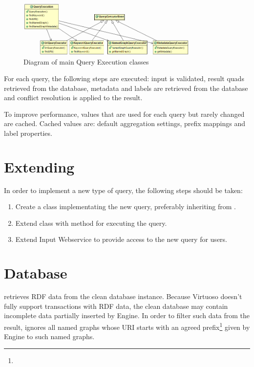 \begin{figure}[htb]
    \centering
    \includegraphics[width=0.8\textwidth]{images/dia-qe.png}
    \caption{Diagram of main Query Execution classes}
	\label{fig:qeClasses}
\end{figure}

For each query, the following steps are executed: input is validated, result quads retrieved from the database, metadata and labels are retrieved from the database and conflict resolution is applied to the result.

To improve performance, values that are used for each query but rarely changed are cached. Cached values are: default aggregation settings, prefix mappings and label properties.

\section{Extending}
\label{sec:qeExtending}
In order to implement a new type of query, the following steps should be taken:

\begin{enumerate}
	\item Create a class implementating the new query, preferably inheriting from .
	\item Extend  class with method for executing the query.
	\item Extend Input Webservice to provide access to the new query for users.
\end{enumerate}

\section{Database}
\QE retrieves RDF data from the clean database instance. Because Virtuoso doesn't fully support transactions with RDF data, the clean database may contain incomplete data partially inserted by Engine. In order to filter such data from the result, \QE ignores all named graphs whose URI starts with an agreed prefix\footnote{} given by Engine to such named graphs.

